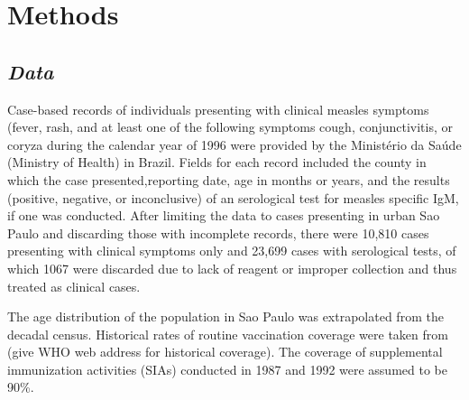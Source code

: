 \section{\texorpdfstring{\textbf{Methods}}{Methods}}\label{methods}

\subsection{\texorpdfstring{\emph{Data}}{Data}}\label{data}

Case-based records of individuals presenting with clinical measles
symptoms (fever, rash, and at least one of the following symptoms cough,
conjunctivitis, or coryza \cite{Hutchins_2004} during the calendar year of 1996 were
provided by the Ministério da Saúde (Ministry of Health) in Brazil. Fields for each
record included the county in which the case presented,reporting date, age in months or years, and the
results (positive, negative, or inconclusive) of an serological test for
measles specific IgM, if one was conducted. After limiting the data to cases
presenting in urban Sao Paulo and discarding those with incomplete
records, there were 10,810 cases presenting with clinical symptoms only
and 23,699 cases with serological tests, of which 1067 were discarded
due to lack of reagent or improper collection and thus treated as
clinical cases.

The age distribution of the population in Sao Paulo was extrapolated
from the decadal census. Historical rates of routine vaccination
coverage were taken from (give WHO web address for historical coverage).
The coverage of supplemental immunization activities (SIAs) conducted in
1987 and 1992 were assumed to be 90\%.